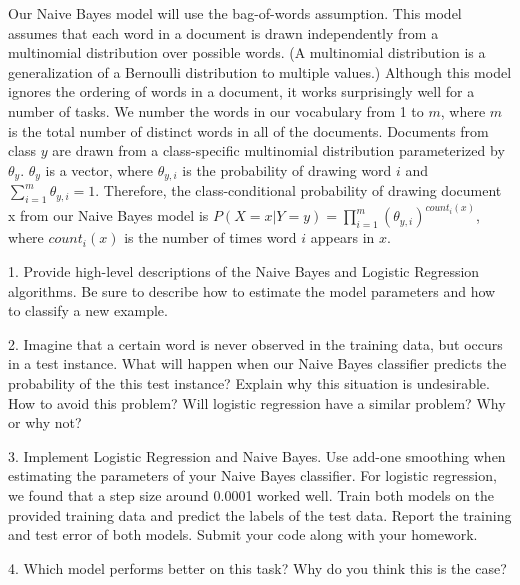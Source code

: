 \documentclass{article}
\theoremstyle{definition}
\theoremstyle{definition}
\theoremstyle{remark}
\begin{document}
Our Naive Bayes model will use the bag-of-words assumption. This model assumes that each word in a
document is drawn independently from a multinomial distribution over possible words. (A multinomial
distribution is a generalization of a Bernoulli distribution to multiple values.) Although this model ignores
the ordering of words in a document, it works surprisingly well for a number of tasks. We number the words
in our vocabulary from 1 to $m$, where $m$ is the total number of distinct words in all of the documents.
Documents from class $y$ are drawn from a class-specific multinomial distribution parameterized by $\theta_y$. $\theta_y$ is
a vector, where $\theta_{y,i}$ is the probability of drawing word $i$ and $\sum_{i=1}^m \theta_{y,i}=1$.
Therefore, the class-conditional probability of drawing document x from our Naive Bayes model is
$P(X = x|Y = y) = \prod_{i=1}^m (\theta_{y,i})^{count_i(x)}$, where $count_i(x)$ is the number of times word $i$ appears in $x$.

1. Provide high-level descriptions of the Naive Bayes and Logistic Regression algorithms. Be
sure to describe how to estimate the model parameters and how to classify a new example.

2. Imagine that a certain word is never observed in the training data, but occurs in a test
instance. What will happen when our Naive Bayes classifier predicts the probability of the this test
instance? Explain why this situation is undesirable. How to avoid this problem? Will logistic regression have a similar problem?
Why or why not?

3. Implement Logistic Regression and Naive Bayes. Use add-one smoothing when estimating
the parameters of your Naive Bayes classifier. For logistic regression, we found that a step size around
0.0001 worked well. Train both models on the provided training data and predict the labels of the test
data. Report the training and test error of both models. Submit your code along with your homework.

4. Which model performs better on this task? Why do you think this is the case?




\end{document}
